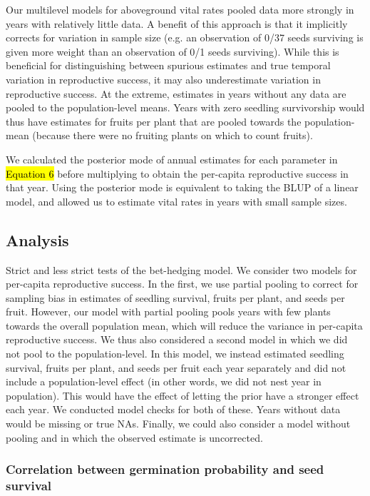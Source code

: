 \documentclass[12pt, oneside, titlepage]{article}   	%
\begin{document}
Our multilevel models for aboveground vital rates pooled data more strongly in years with relatively little data. A benefit of this approach is that it implicitly corrects for variation in sample size (e.g. an observation of 0/37 seeds surviving is given more weight than an observation of 0/1 seeds surviving). While this is beneficial for distinguishing between spurious estimates and true temporal variation in reproductive success, it may also underestimate variation in reproductive success. At the extreme, estimates in years without any data are pooled to the population-level means. Years with zero seedling survivorship would thus have estimates for fruits per plant that are pooled towards the population-mean (because there were no fruiting plants on which to count fruits). 

We calculated the posterior mode of annual estimates for each parameter in \hl{Equation 6} before multiplying to obtain the per-capita reproductive success in that year. Using the posterior mode is equivalent to taking the BLUP of a linear model, and allowed us to estimate vital rates in years with small sample sizes. 

\subsection*{Analysis}

Strict and less strict tests of the bet-hedging model. We consider two models for per-capita reproductive success. In the first, we use partial pooling to correct for sampling bias in estimates of seedling survival, fruits per plant, and seeds per fruit. However, our model with partial pooling pools years with few plants towards the overall population mean, which will reduce the variance in per-capita reproductive success. We thus also considered a second model in which we did not pool to the population-level. In this model, we instead estimated seedling survival, fruits per plant, and seeds per fruit each year separately and did not include a population-level effect (in other words, we did not nest year in population). This would have the effect of letting the prior have a stronger effect each year. We conducted model checks for both of these. Years without data would be missing or true NAs. Finally, we could also consider a model without pooling and in which the observed estimate is uncorrected. 

\subsubsection*{Correlation between germination probability and seed survival}
\end{document}
